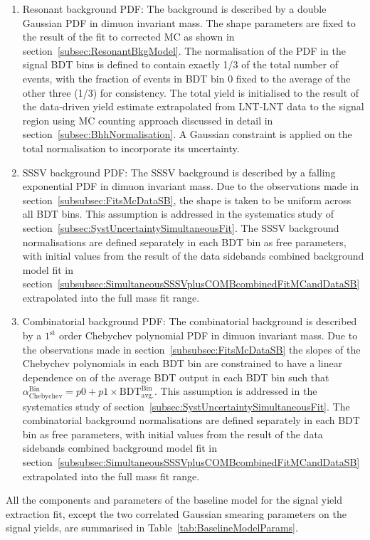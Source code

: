\begin{enumerate}
\item Resonant background PDF: The \Bhh background is described by a double Gaussian PDF in dimuon invariant mass. The shape parameters are fixed to the result of the fit to corrected \Bhh MC as shown in section~\ref{subsec:ResonantBkgModel}. The normalisation of the \Bhh PDF in the signal BDT bins is defined to contain exactly 1/3 of the total number of \Bhh events, with the fraction of events in BDT bin 0 fixed to the average of the other three (1/3) for consistency. The total \Bhh yield is initialised to the result of the data-driven \Bhh yield estimate extrapolated from LNT-LNT data to the signal region using MC counting approach discussed in detail in section~\ref{subsec:BhhNormalisation}. A Gaussian constraint is applied on the total \Bhh normalisation to incorporate its uncertainty.
\item SSSV background PDF: The SSSV background is described by a falling exponential PDF in dimuon invariant mass. Due to the observations made in section~\ref{subsubsec:FitsMcDataSB}, the shape is taken to be uniform across all BDT bins. This assumption is addressed in the systematics study of section~\ref{subsec:SystUncertaintySimultaneousFit}. The SSSV background normalisations are defined separately in each BDT bin as free parameters, with initial values from the result of the data sidebands combined background model fit in section~\ref{subsubsec:SimultaneousSSSVplusCOMBcombinedFitMCandDataSB} extrapolated into the full mass fit range.
\item Combinatorial background PDF: The combinatorial background is described by a $1^{\text{st}}$ order Chebychev polynomial PDF in dimuon invariant mass. Due to the observations made in section~\ref{subsubsec:FitsMcDataSB} the slopes of the Chebychev polynomials in each BDT bin are constrained to have a linear dependence on of the average BDT output in each BDT bin such that $\alpha_{\text{Chebychev}}^{\text{Bin}} = p0 + p1 \times \text{BDT}_{\text{avg.}}^{\text{Bin}}$. This assumption is addressed in the systematics study of section~\ref{subsec:SystUncertaintySimultaneousFit}. The combinatorial background normalisations are defined separately in each BDT bin as free parameters, with initial values from the result of the data sidebands combined background model fit in section~\ref{subsubsec:SimultaneousSSSVplusCOMBcombinedFitMCandDataSB} extrapolated into the full mass fit range.
\end{enumerate}

All the components and parameters of the baseline model for the signal yield extraction fit, except the two correlated Gaussian smearing parameters on the signal yields, are summarised in Table~\ref{tab:BaselineModelParams}.

